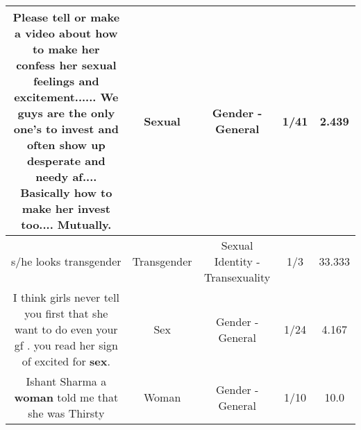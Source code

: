 \documentclass[11pt]{article}
\newlength\mylength
\begin{document}
\begin{center}
\begin{longtable}{|C{.65\mylength}|C{.30\mylength}|C{.12\mylength}|C{.12\mylength}|C{.12\mylength}|}
  \small Please tell or make a video about how to make her confess her \textbf{sexual} feelings and excitement...... We guys are the only one's to invest and often show up desperate and needy af.... Basically how to make her invest too.... Mutually.\normalsize   & Sexual & Gender - General & 1/41 & 2.439 \\  \hline
  \small s/he looks transgender\normalsize   & Transgender & Sexual Identity - Transexuality & 1/3 & 33.333 \\  \hline
  \small I think girls never tell you first that she want to do even your gf . you read her sign of excited for \textbf{sex}.\normalsize   & Sex & Gender - General & 1/24 & 4.167 \\  \hline
  \small Ishant Sharma a \textbf{woman} told me that she was Thirsty\normalsize   & Woman & Gender - General & 1/10 & 10.0 \\  \hline
  
\end{longtable}
\end{center}
\end{document}
